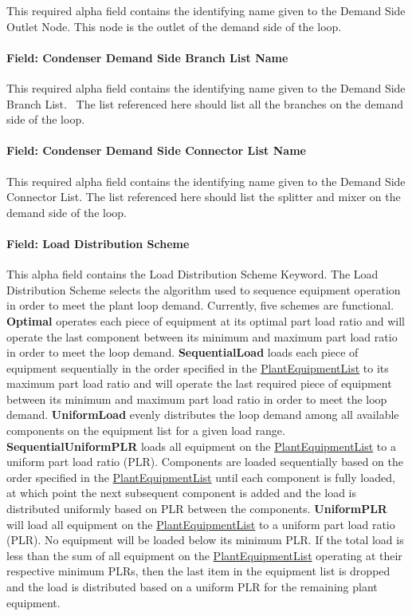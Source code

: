 This required alpha field contains the identifying name given to the Demand Side Outlet Node. This node is the outlet of the demand side of the loop.

\paragraph{Field: Condenser Demand Side Branch List Name}\label{field-condenser-demand-side-branch-list-name}

This required alpha field contains the identifying name given to the Demand Side Branch List.~ The list referenced here should list all the branches on the demand side of the loop.

\paragraph{Field: Condenser Demand Side Connector List Name}\label{field-condenser-demand-side-connector-list-name}

This required alpha field contains the identifying name given to the Demand Side Connector List. The list referenced here should list the splitter and mixer on the demand side of the loop.

\paragraph{Field: Load Distribution Scheme}\label{field-load-distribution-scheme-1-000}

This alpha field contains the Load Distribution Scheme Keyword. The Load Distribution Scheme selects the algorithm used to sequence equipment operation in order to meet the plant loop demand. Currently, five schemes are functional. \textbf{Optimal} operates each piece of equipment at its optimal part load ratio and will operate the last component between its minimum and maximum part load ratio in order to meet the loop demand. \textbf{SequentialLoad} loads each piece of equipment sequentially in the order specified in the \hyperref[plantequipmentlist]{PlantEquipmentList} to its maximum part load ratio and will operate the last required piece of equipment between its minimum and maximum part load ratio in order to meet the loop demand. \textbf{UniformLoad} evenly distributes the loop demand among all available components on the equipment list for a given load range. \textbf{SequentialUniformPLR} loads all equipment on the \hyperref[plantequipmentlist]{PlantEquipmentList} to a uniform part load ratio (PLR). Components are loaded sequentially based on the order specified in the \hyperref[plantequipmentlist]{PlantEquipmentList} until each component is fully loaded, at which point the next subsequent component is added and the load is distributed uniformly based on PLR between the components. \textbf{UniformPLR} will load all equipment on the \hyperref[plantequipmentlist]{PlantEquipmentList} to a uniform part load ratio (PLR). No equipment will be loaded below its minimum PLR. If the total load is less than the sum of all equipment on the \hyperref[plantequipmentlist]{PlantEquipmentList} operating at their respective minimum PLRs, then the last item in the equipment list is dropped and the load is distributed based on a uniform PLR for the remaining plant equipment.

